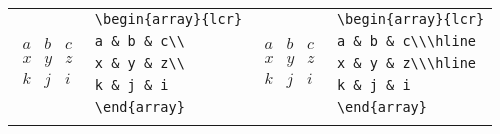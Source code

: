 \documentclass[10pt, english]{article}
\begin{document}
	\begin{center}
		\scriptsize
	\begin{tabular}{ll|ll}
		\multirow{5}{*}{$\begin{array}{lcr}a & b & c\\ x & y & z\\ k & j & i\end{array}$} & \verb|\begin{array}{lcr}| & \multirow{5}{*}{$\begin{array}{lcr}a & b & c\\\hline x & y & z\\\hline k & j & i\end{array}$} & \verb|\begin{array}{lcr}| \\
		& \verb|a & b & c\\| & & \verb|a & b & c\\\hline| \\
		& \verb|x & y & z\\| & & \verb|x & y & z\\\hline| \\
		& \verb|k & j & i| & & \verb|k & j & i| \\
		& \verb|\end{array}| & & \verb|\end{array}| \\
		& & & \\
	\end{tabular}
	\end{center}
\end{document}
